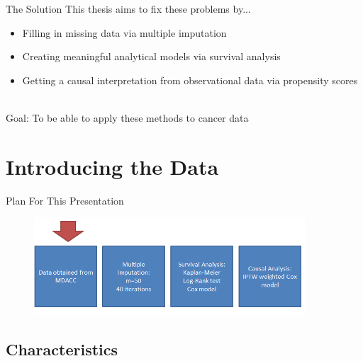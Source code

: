 \begin{frame}{The Solution}
This thesis aims to fix these problems by...
  \begin{itemize}
   \item Filling in missing data via multiple imputation
   \item Creating meaningful analytical models via survival analysis
   \item Getting a causal interpretation from observational data via propensity scores\\~\\
  \end{itemize}
Goal: To be able to apply these methods to cancer data

\end{frame}


\section{Introducing the Data}
\begin{frame}[noframenumbering]{Plan For This Presentation}
  \begin{figure}[h!]
  \centering
    \includegraphics[width=0.9\textwidth]{data_flow}
\label{fig:data_flow}
\end{figure} 
\end{frame}

\subsection{Characteristics}

